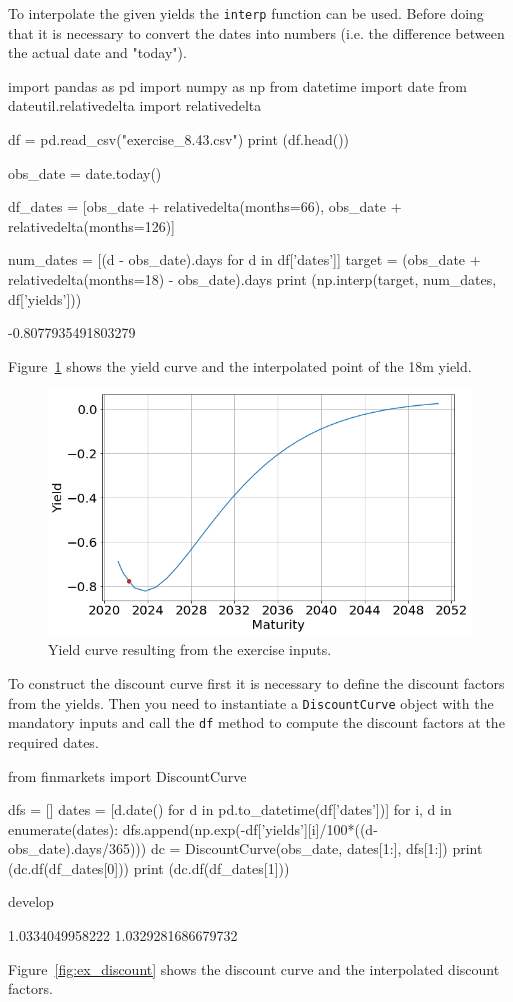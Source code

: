 \cprotEnv\begin{solution}
To interpolate the given yields the \texttt{interp} function can be used. Before doing that it is necessary to convert the dates into numbers (i.e. the difference between the actual date and "today").
\begin{ipython}
import pandas as pd
import numpy as np
from datetime import date
from dateutil.relativedelta import relativedelta

df = pd.read_csv("exercise_8.43.csv")
print (df.head())

obs_date = date.today()

df_dates = [obs_date + relativedelta(months=66),
            obs_date + relativedelta(months=126)]

num_dates = [(d - obs_date).days for d in df['dates']]
target = (obs_date + relativedelta(months=18) - obs_date).days
print (np.interp(target, num_dates, df['yields']))
\end{ipython}
\begin{ioutput}
-0.8077935491803279
\end{ioutput}

Figure~\ref{fig:ex_yield} shows the yield curve and the interpolated point of the 18m yield.

\begin{figure}[htpb]
\centering
\includegraphics[width=0.7\linewidth]{figures/ex_yield}
\caption{Yield curve resulting from the exercise inputs.}
\label{fig:ex_yield}
\end{figure}

To construct the discount curve first it is necessary to define the discount factors from the yields. Then you need to instantiate a \texttt{DiscountCurve} object with the mandatory inputs and call the \texttt{df} method to compute the discount factors at the required dates.
\begin{ipython}
from finmarkets import DiscountCurve

dfs = []
dates = [d.date() for d in pd.to_datetime(df['dates'])]
for i, d in enumerate(dates):
    dfs.append(np.exp(-df['yields'][i]/100*((d-obs_date).days/365)))
dc = DiscountCurve(obs_date, dates[1:], dfs[1:])
print (dc.df(df_dates[0]))
print (dc.df(df_dates[1]))
\end{ipython}develop
\begin{ioutput}
1.0334049958222
1.0329281686679732
\end{ioutput}
\noindent
Figure~\ref{fig:ex_discount} shows the discount curve and the interpolated discount factors.


\end{solution}
